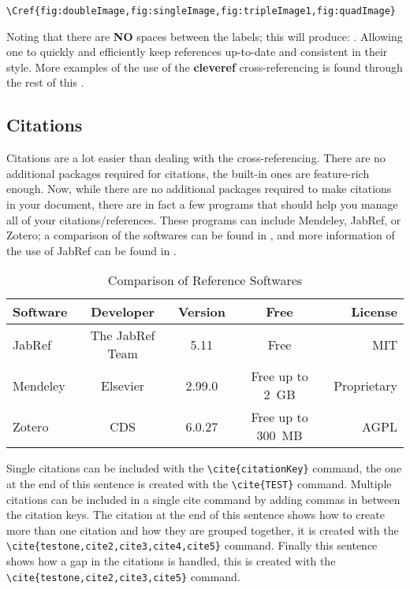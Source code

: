         \begin{lstlisting}[style=LaTeXStyle]
			\Cref{fig:doubleImage,fig:singleImage,fig:tripleImage1,fig:quadImage}
		\end{lstlisting}
        
    Noting that there are \textbf{NO} spaces between the labels; this will produce: . Allowing one to quickly and efficiently keep references up-to-date and consistent in their style.
    More examples of the use of the \textbf{cleveref} cross-referencing is found through the rest of this .
  \subsection{Citations}\label{subsec:citations}
      Citations are a lot easier than dealing with the cross-referencing.
      There are no additional packages required for citations, the built-in ones are feature-rich enough.
      Now, while there are no additional packages required to make citations in your document, there are in fact a few programs that should help you manage all of your citations/references.
      These programs can include Mendeley, JabRef, or Zotero; a comparison of the softwares can be found in , and more information of the use of JabRef can be found in .
      
      \begin{table}[htbp]
          \centering
          \caption{Comparison of Reference Softwares}\label{tab:refSoftware}%
            \begin{tabularx}{0.9\textwidth}{Lcccr}
                \toprule
                    Software & Developer & Version & Free & License \\
                \midrule
                    JabRef   & The JabRef Team & 5.11   & Free   & MIT \\
                    Mendeley & Elsevier          & 2.99.0 & {Free up to 2 GB} & Proprietary \\
                    Zotero   & CDS               & 6.0.27 & {Free  up to 300 MB} & AGPL \\
                \bottomrule
            \end{tabularx}%
      \end{table}%
      
      Single citations can be included with the \lstinline|\cite{citationKey}| command, the one at the end of this sentence is created with the \lstinline|\cite{TEST}| command\cite{TEST}. 
      Multiple citations can be included in a single cite command by adding commas in between the citation keys. The citation at the end of this sentence shows how to create more than one citation and how they are grouped together, it is created with the \lstinline|\cite{testone,cite2,cite3,cite4,cite5}| command\cite{testone,cite2,cite3,cite4,cite5}.
      Finally this sentence shows how a gap in the citations is handled, this is created with the \lstinline|\cite{testone,cite2,cite3,cite5}| command\cite{testone,cite2,cite3,cite5}. 
